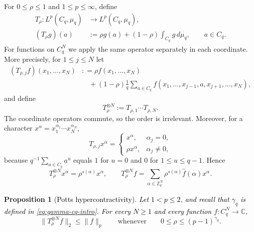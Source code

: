\documentclass[11pt,a4paper]{article}
\numberwithin{equation}{section}
\theoremstyle{cleanplain}
\newtheorem{proposition}[proposition]{Proposition}
\theoremstyle{cleandefinition}
\theoremstyle{cleanremark}
\newcommand{\C}{\mathbb C}
\begin{document}
{\color{black}For $0\leq\rho\leq1$ and $1\leq p\leq\infty$, define}
\begin{equation}\label{eq:Potts-operator}
 \begin{aligned}
 T_\rho:L^p(C_q,\mu_q)&\longrightarrow L^p(C_q,\mu_q),\\
 (T_\rho g)(a)&:=\rho g(a)
 +(1-\rho)\int_{C_q}g\,d\mu_q,
 \qquad a\in C_q.
 \end{aligned}
\end{equation}
{\color{black}
For functions on $C_q^N$ we apply the same operator separately in each
coordinate.  More precisely, for $1\leq j\leq N$ let
\[
 \begin{aligned}
 (T_{\rho,j}f)(x_1,\ldots,x_N)
 &: =\rho f(x_1,\ldots,x_N)\\
 &\quad +(1-\rho)\frac1q\sum_{a\in C_q}
 f(x_1,\ldots,x_{j-1},a,x_{j+1},\ldots,x_N),
 \end{aligned}
\]
and define
\begin{equation}\label{eq:Potts-product-domain}
 T_\rho^{\otimes N}:=T_{\rho,1}\cdots T_{\rho,N}.
\end{equation}
The coordinate operators commute, so the order is irrelevant.  Moreover, for
a character $x^\alpha=x_1^{\alpha_1}\cdots x_N^{\alpha_N}$,
\[
 T_{\rho,j}x^\alpha=
 \begin{cases}
 x^\alpha,&\alpha_j=0,\\
 \rho x^\alpha,&\alpha_j\neq0,
 \end{cases}
\]
because $q^{-1}\sum_{a\in C_q}a^u$ equals $1$ for $u=0$ and $0$ for
$1\leq u\leq q-1$.  Hence
\begin{equation}\label{eq:Potts-product-Fourier}
 T_\rho^{\otimes N}x^\alpha=\rho^{s(\alpha)}x^\alpha,
 \qquad
 T_\rho^{\otimes N}f
 =\sum_{\alpha\in\mathbb Z_q^N}
 \rho^{s(\alpha)}\widehat f(\alpha)x^\alpha.
\end{equation}
}
\begin{proposition}[\textcolor{black}{Potts hypercontractivity}]\label{prop:Potts-body}
\textcolor{black}{Let $1<p\leq2$, and recall that $\gamma_q$ is defined in \eqref{eq:gamma-cq-intro}. For every $N\geq1$ and every function}
$f:C_q^N\to\C$,
\begin{equation}\label{eq:Potts-HC}
 \|T_\rho^{\otimes N}f\|_2\leq\|f\|_p
 \qquad\text{whenever}\qquad
 0\leq\rho\leq(p-1)^{\gamma_q}.
\end{equation}
\end{proposition}
\end{document}
